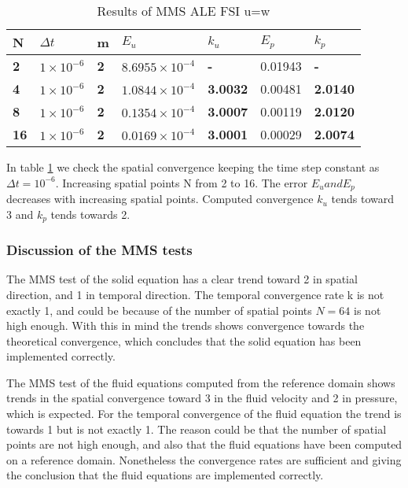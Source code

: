\begin{table}[H]
\centering
\caption{Results of MMS ALE FSI u=w}
\label{tab:MMS_Fluid_space}
\begin{tabular}{|l|l|l|l|l|l|l|}
\hline
\textbf{N}  & $\Delta t$ & \textbf{m} & $E_u$                   & \textbf{$k_u$}  & $E_p$   & \textbf{$k_p$}  \\ \hline
\textbf{2}  & $1 \times 10^{-6}$ & \textbf{2} & $8.6955 \times 10^{-4}$ & \textbf{-}      & 0.01943 & \textbf{-}      \\ \hline
\textbf{4}  & $1 \times 10^{-6}$ & \textbf{2} & $1.0844 \times 10^{-4}$ & \textbf{3.0032} & 0.00481 & \textbf{2.0140} \\ \hline
\textbf{8}  & $1 \times 10^{-6}$ & \textbf{2} & $0.1354 \times 10^{-4}$ & \textbf{3.0007} & 0.00119 & \textbf{2.0120} \\ \hline
\textbf{16} & $1 \times 10^{-6}$ & \textbf{2} & $0.0169 \times 10^{-4}$ & \textbf{3.0001} & 0.00029 & \textbf{2.0074} \\ \hline
\end{tabular}
\end{table}

In table \ref{tab:MMS_Fluid_space} we check the spatial convergence keeping the time step constant as $\Delta t=10^{-6}$. Increasing spatial points N from 2 to 16. The error $E_u and E_p$ decreases with increasing spatial points. Computed convergence $k_u$ tends toward 3 and $k_p$ tends towards 2.

\subsubsection*{Discussion of the MMS tests}
The MMS test of the solid equation has a clear trend toward 2 in spatial direction, and 1 in temporal direction. The temporal convergence rate k is not exactly 1, and could be because of the number of spatial points $N=64$ is not high enough. With this in mind the trends shows convergence towards the theoretical convergence, which concludes that the solid equation has been implemented correctly.

The MMS test of the fluid equations computed from the reference domain shows trends in the spatial convergence toward 3 in the fluid velocity and 2 in pressure, which is expected. For the temporal convergence of the fluid equation the trend is towards 1 but is not exactly 1. The reason could be that the number of spatial points are not high enough, and also that the fluid equations have been computed on a reference domain. Nonetheless the convergence rates are sufficient and giving the conclusion that the fluid equations are implemented correctly.

